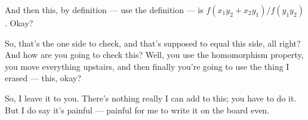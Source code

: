 \begin{speech}[00:32:03 - 00:32:50]
And then this, by definition --- use the definition --- is $f(x_1 y_2 + x_2 y_1)/f(y_1 y_2)$.  Okay?

So, that's the one side to check, and that's supposed to equal this side, all right? And how are you going to check this? Well, you use the homomorphism property, you move everything upstairs, and then finally you're going to use the thing I erased --- this, okay?

So, I leave it to you. There's nothing really I can add to this; you have to do it. But I do say it's painful --- painful for me to write it on the board even.
\end{speech}

